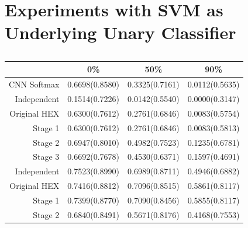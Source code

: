 \documentclass[11pt,a4paper]{article}
\begin{document}
\section{Experiments with SVM as Underlying Unary Classifier}
\label{sec:svm}

\begin{table}[htbp]
\centering
\begin{tabular}{r|c|c|c}
 & 0\% & 50\% & 90\%\\
\hline
CNN Softmax  & 0.6698(0.8580) & 0.3325(0.7161) & 0.0112(0.5635)\\
Independent  & 0.1514(0.7226) & 0.0142(0.5540) & 0.0000(0.3147)\\
Original HEX & 0.6300(0.7612) & 0.2761(0.6846) & 0.0083(0.5754)\\
Stage 1      & 0.6300(0.7612) & 0.2761(0.6846) & 0.0083(0.5813)\\
Stage 2      & 0.6947(0.8010) & 0.4982(0.7523) & 0.1235(0.6781)\\
Stage 3      & 0.6692(0.7678) & 0.4530(0.6371) & 0.1597(0.4691)\\
\hline
Independent  & 0.7523(0.8990) & 0.6989(0.8711) & 0.4946(0.6882)\\
Original HEX & 0.7416(0.8812) & 0.7096(0.8515) & 0.5861(0.8117)\\
Stage 1      & 0.7399(0.8770) & 0.7090(0.8456) & 0.5855(0.8117)\\
Stage 2      & 0.6840(0.8491) & 0.5671(0.8176) & 0.4168(0.7553)
\end{tabular}
\caption{}
\label{tab:svmacc}
\end{table}
\end{document}
